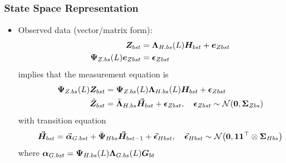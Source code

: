 \documentclass[10pt, compress, notheorems, aspectratio=169]{beamer}
\let\originalleft\left
\let\originalright\right
\renewcommand{\left}{\mathopen{}\mathclose \bgroup \originalleft}
\renewcommand{\right}{\aftergroup \egroup \originalright}
\begin{document}
\begin{frame}
	\frametitle{State Space Representation}
	\begin{itemize}
		\item Observed data (vector/matrix form):
			\begin{align*}
				{\bm Z}_{bst} &= {\bm \Lambda}_{H.bs} \left( L \right) {\bm H}_{bst} + {\bm e}_{Zbst} \\
				{\bm \Psi}_{Z.bs} (L) {\bm e}_{Zbst} &= {\bm \epsilon}_{Zbst}
			\end{align*}
			implies that the measurement equation is
			\begin{equation}
				\begin{aligned}
					{\bm \Psi}_{Z.bs} (L) {\bm Z}_{bst} &= {\bm \Psi}_{Z.bs} (L) {\bm \Lambda}_{H.bs} \left( L \right) {\bm H}_{bst} + {\bm \epsilon}_{Zbst} \\
					\tilde{\bm Z}_{bst} &= \tilde{\bm \Lambda}_{H.bs} \vec{\bm H}_{bst} + {\bm \epsilon}_{Zbst}, \quad {\bm \epsilon}_{Zbst} \sim \mathcal{N} \left( {\bf 0}, {\bm \Sigma}_{Zbs} \right)
				\end{aligned}
			\end{equation}
			with transition equation
			\begin{equation}
				\vec{\bm H}_{bst} = \vec{\bm \alpha}_{G.bst} + \tilde{\bm \Psi}_{Hbs} \vec{\bm H}_{bst-1} + \vec{\bm \epsilon}_{Hbst}, \quad \vec{\bm \epsilon}_{Hbst} \sim \mathcal{N} \left( {\bf 0}, {\bf 1} {\bf 1}^{\top} \otimes {\bm \Sigma}_{Hbs} \right)
			\end{equation}
			where ${\bm \alpha}_{G.bst} = {\bm \Psi}_{H.bs} \left( L \right) {\bm \Lambda}_{G.bs} \left( L \right) {\bm G}_{bt}$
	\end{itemize}
\end{frame}
\end{document}
